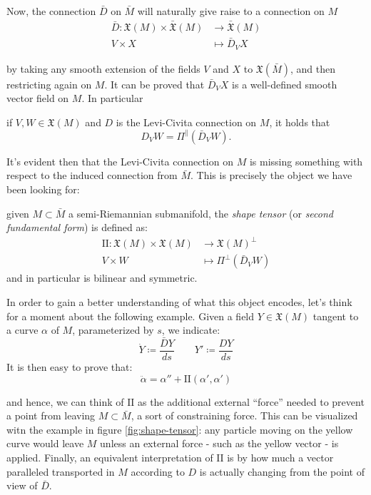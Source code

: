 Now, the connection \(\bar{D}\) on \(\bar{M}\) will naturally give raise to a connection on \(M\)
\begin{align*}
\bar{D} : \mathfrak{X}(M) \times \bar{\mathfrak{X}}(M) & \rightarrow \bar{\mathfrak{X}}(M) \\
	 V \times X &\mapsto \bar{D}_V X
\end{align*}

by taking any smooth extension of the fields \(V\) and \(X\) to \(\mathfrak{X}(\bar{M})\), and then restricting again on \(M\). It can be proved that \(\bar{D}_V X\) is a well-defined smooth vector field on \(M\). In particular
\begin{lemma} 
	if \(V, W \in \mathfrak{X}(M)\) and \(D\) is the Levi-Civita connection on \(M\), it holds that
	\[
	D_V W = \Pi^{\parallel}\left(\bar{D}_V W\right).
	\]
\end{lemma}

It's evident then that the Levi-Civita connection on \(M\) is missing something with respect to the induced connection from \(\bar{M}\). This is precisely the object we have been looking for:

\begin{definition}
	given \(M \subset \bar{M}\) a semi-Riemannian submanifold, the \emph{shape tensor} (or \emph{second fundamental form}) is defined as:
	\begin{align*}
		\mathrm{I\!I} : \mathfrak{X}(M) \times \mathfrak{X}(M) &\longrightarrow \mathfrak{X}(M)^{\perp}\\
							V \times W &\mapsto \Pi^{\perp}\left(\bar{D}_V W\right)
	\end{align*}
	\noindent and in particular is bilinear and symmetric.
\end{definition}

In order to gain a better understanding of what this object encodes, let's think for a moment about the following example. Given a field \(Y \in \mathfrak{X}(M)\) tangent to a curve \(\alpha\) of \(M\), parameterized by \(s\), we indicate:
\[
\dot{Y} \coloneqq \frac{\bar{D}Y}{ds} \quad \quad Y' \coloneqq \frac{DY}{ds}
\]
It is then easy to prove that:
\[
\ddot{\alpha} = \alpha'' + \mathrm{I\!I}(\alpha', \alpha')
\]

and hence, we can think of \(\mathrm{I\!I}\) as the additional external ``force'' needed to prevent a point from leaving \(M \subset \bar{M}\), a sort of constraining force.
This can be visualized witn the example in figure \ref{fig:shape-tensor}: any particle moving on the yellow curve would leave \(M\) unless an external force - such as the yellow vector - is applied.
Finally, an equivalent interpretation of \(\mathrm{I\!I}\) is by how much a vector paralleled transported in \(M\) according to \(D\) is actually changing from the point of view of \(\bar{D}\).

